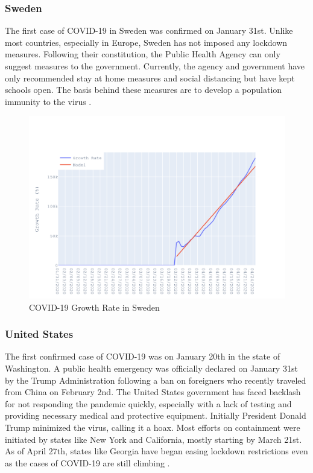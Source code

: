 \documentclass{homework}
\begin{document}
\newpage
\subsubsection{Sweden}

The first case of COVID-19 in Sweden was confirmed on January 31st. Unlike most countries, especially in Europe, Sweden has not imposed any lockdown measures. Following their constitution, the Public Health Agency can only suggest measures to the government. Currently, the agency and government have only recommended stay at home measures and social distancing but have kept schools open. The basis behind these measures are to develop a population immunity to the virus \cite{savage_2020}.

\begin{figure}[H]
  \centering
  \includegraphics[scale=0.3]{task3/Sweden.png}
  \caption{COVID-19 Growth Rate in Sweden}
\end{figure}


\newpage
\subsubsection{United States}

The first confirmed case of COVID-19 was on January 20th in the state of Washington. A public health emergency was officially declared on January 31st by the Trump Administration following a ban on foreigners who recently traveled from China on February 2nd. The United States government has faced backlash for not responding the pandemic quickly, especially with a lack of testing and providing necessary medical and protective equipment. Initially President Donald Trump minimized the virus, calling it a hoax. Most efforts on containment were initiated by states like New York and California, mostly starting by March 21st. As of April 27th, states like Georgia have began easing lockdown restrictions even as the cases of COVID-19 are still climbing \cite{staff_2020}.
\end{document}
